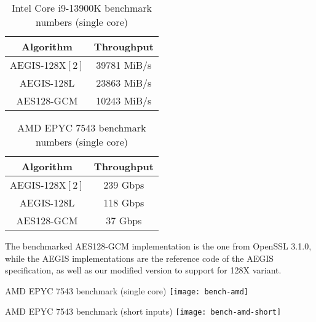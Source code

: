 \documentclass[envcountsame,runningheads,notitlepage]{llncs}
\begin{document}
\begin{table}
  \begin{center}
    \begin{tabular}{|c|c|}
      \hline
      Algorithm       & Throughput  \\
      \hline
      AEGIS-128X$[2]$ & 39781 MiB/s \\
      \hline
      AEGIS-128L      & 23863 MiB/s \\
      \hline
      AES128-GCM      & 10243 MiB/s \\
      \hline
    \end{tabular}
\caption{\label{i9-13900K}Intel Core i9-13900K benchmark numbers (single core)}
  \end{center}
\end{table}

\begin{table}
  \begin{center}
    \begin{tabular}{|c|c|}
      \hline
      Algorithm       & Throughput  \\
      \hline
AEGIS-128X$[2]$ & 239 Gbps \\
      \hline
AEGIS-128L      & 118 Gbps \\
\hline
AES128-GCM      & 37 Gbps  \\
      \hline
    \end{tabular}
\caption{\label{epyc-7543}AMD EPYC 7543 benchmark numbers (single core)}
  \end{center}
\end{table}

The benchmarked AES128-GCM implementation is the one from OpenSSL 3.1.0, while the AEGIS implementations are the reference code of the AEGIS specification, as well as our modified version to support for 128X variant.

\begin{center}
  \label{epyc-7543-graph}AMD EPYC 7543 benchmark (single core)
  \texttt{[image: bench-amd]}
\end{center}

\begin{center}
  \label{epyc-7543-graph-short}AMD EPYC 7543 benchmark (short inputs)
  \texttt{[image: bench-amd-short]}
\end{center}

\ifnum{}
  
\else
  
\fi

\end{document}
